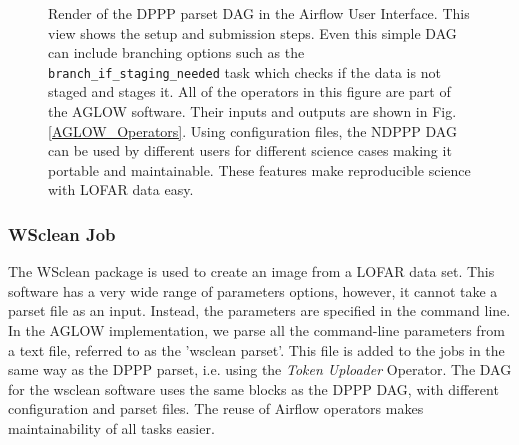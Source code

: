 \begin{figure}[H]
 \centering
  \caption{Render of the DPPP parset DAG in the Airflow User Interface. This view shows the setup and submission steps. Even this simple DAG can include branching options such as the \texttt{branch\_if\_staging\_needed} task which checks if the data is not staged and stages it. All of the operators in this figure are part of the AGLOW software. Their inputs and outputs are shown in Fig. \ref{AGLOW_Operators}. Using configuration files, the NDPPP DAG can be used by different users for different science cases making it portable and maintainable. These features make reproducible science with LOFAR data easy. 
 }
 \label{fig:NDPPP_DAG}
\end{figure}

\subsubsection{WSclean Job}

The WSclean\cite{wsclean} package is used to create an image from a LOFAR data set. This software has a very wide range of parameters options, however, it cannot take a parset file as an input. Instead, the parameters are specified in the command line. In the AGLOW implementation, we parse all the command-line parameters from a text file, referred to as the 'wsclean parset'. This file is added to the jobs in the same way as the DPPP parset, i.e. using the \textit{Token Uploader} Operator. The DAG for the wsclean software uses the same blocks as the DPPP DAG, with different configuration and parset files. The reuse of Airflow operators makes maintainability of all tasks easier. 

